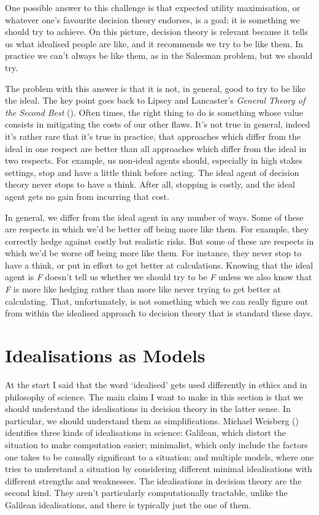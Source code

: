 \documentclass[
  11pt,
  letterpaper,
  DIV=11,
  numbers=noendperiod,
  twoside]{scrartcl}
\begin{document}
One possible answer to this challenge is that expected utility
maximisation, or whatever one's favourite decision theory endorses, is a
goal; it is something we should try to achieve. On this picture,
decision theory is relevant because it tells us what idealised people
are like, and it recommends we try to be like them. In practice we can't
always be like them, as in the Salesman problem, but we should try.

The problem with this answer is that it is not, in general, good to try
to be like the ideal. The key point goes back to Lipsey and Lancaster's
\emph{General Theory of the Second Best}
(). Often
times, the right thing to do is something whose value consists in
mitigating the costs of our other flaws. It's not true in general,
indeed it's rather rare that it's true in practice, that approaches
which differ from the ideal in one respect are better than all
approaches which differ from the ideal in two respects. For example, us
non-ideal agents should, especially in high stakes settings, stop and
have a little think before acting. The ideal agent of decision theory
never stops to have a think. After all, stopping is costly, and the
ideal agent gets no gain from incurring that cost.

In general, we differ from the ideal agent in any number of ways. Some
of these are respects in which we'd be better off being more like them.
For example, they correctly hedge against costly but realistic risks.
But some of these are respects in which we'd be worse off being more
like them. For instance, they never stop to have a think, or put in
effort to get better at calculations. Knowing that the ideal agent is
\emph{F} doesn't tell us whether we should try to be \emph{F} unless we
also know that \emph{F} is more like hedging rather than more like never
trying to get better at calculating. That, unfortunately, is not
something which we can really figure out from within the idealised
approach to decision theory that is standard these days.

\section{Idealisations as Models}\label{idealisations-as-models}

At the start I said that the word `idealised' gets used differently in
ethics and in philosophy of science. The main claim I want to make in
this section is that we should understand the idealisations in decision
theory in the latter sense. In particular, we should understand them as
simplifications. Michael Weisberg ()
identifies three kinds of idealisations in science: Galilean, which
distort the situation to make computation easier; minimalist, which only
include the factors one takes to be causally significant to a situation;
and multiple models, where one tries to understand a situation by
considering different minimal idealisations with different strengths and
weaknesses. The idealisations in decision theory are the second kind.
They aren't particularly computationally tractable, unlike the Galilean
idealisations, and there is typically just the one of them.
\end{document}
